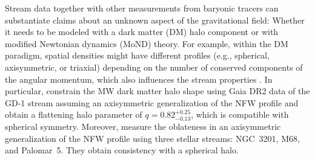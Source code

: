 \documentclass[twocolumn]{aa}
\begin{document}
Stream data together with other measurements from baryonic tracers can substantiate claims about an unknown aspect of the gravitational field: Whether it needs to be modeled with a dark matter (DM) halo component or with modified Newtonian dynamics (MoND) theory.
For example, within the DM paradigm, spatial densities might have different profiles
(e.g., spherical, axisymmetric, or triaxial) depending on the number of conserved components of the angular momentum, which also influences the stream properties \citep{2013ApJ...773L...4V,2016MNRAS.455.1079P,2020MNRAS.492.4398M}.
In particular, \citet{2019MNRAS.486.2995M} constrain the MW dark matter halo shape using Gaia DR2 data of the GD-1 stream assuming an axisymmetric generalization of the NFW \citep{1996ApJ...462..563N} profile and obtain a flattening halo parameter of $q=0.82^{+0.25}_{-0.13}$, which is compatible with spherical symmetry.
Moreover, \cite{2023MNRAS.524.2124P} measure the oblateness in an axisymmetric generalization of the NFW profile using three stellar streams: NGC~3201, M68, and Palomar~5. They obtain
consistency with a spherical halo.
\end{document}
